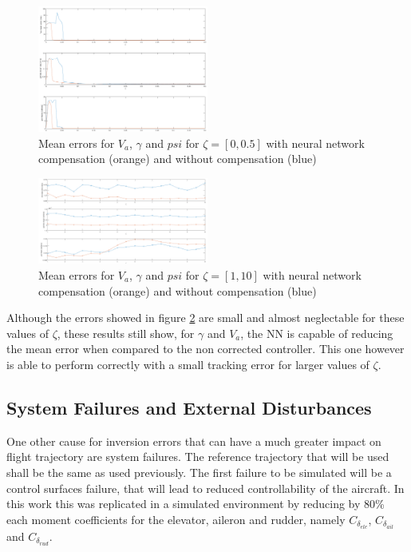 \begin{figure}[h]
\centering
\includegraphics[width=0.5\textwidth]{../Figures/Results/mean_error_xi.png}
\caption[Mean errors for $V_a$, $\gamma$ and $psi$]{Mean errors for $V_a$, $\gamma$ and $psi$ for $\zeta=[0,0.5]$ with neural network compensation (orange) and without compensation (blue)}
\label{fig:xi_mean_error}
\end{figure}

\begin{figure}[h]
\centering
\includegraphics[width=0.5\textwidth]{../Figures/Results/mean_error_xi_big.png}
\caption[Mean errors for $V_a$, $\gamma$ and $psi$ for larger values of $\zeta$ ]{Mean errors for $V_a$, $\gamma$ and $psi$ for $\zeta=[1,10]$ with neural network compensation (orange) and without compensation (blue)}
\label{fig:xi_mean_error_big}
\end{figure}

Although the errors showed in figure \ref{fig:xi_mean_error_big} are small and almost neglectable for these values of $\zeta$, these results still show, for $\gamma$ and $V_a$, the NN is capable of reducing the mean error when compared to the non corrected controller. This one however is able to perform correctly with a small tracking error for larger values of $\zeta$.

\subsection{System Failures and External Disturbances}

One other cause for inversion errors that can have a much greater impact on flight trajectory are system failures.  The reference trajectory that will be used shall be the same as used previously. The first failure to be simulated will be a control surfaces failure, that will lead to reduced controllability of the aircraft. In this work this was replicated in a simulated environment by reducing by 80\% each moment coefficients for the elevator, aileron and rudder, namely $C_{\delta_{ele}}$, $C_{\delta_{ail}}$ and $C_{\delta_{rud}}$.

